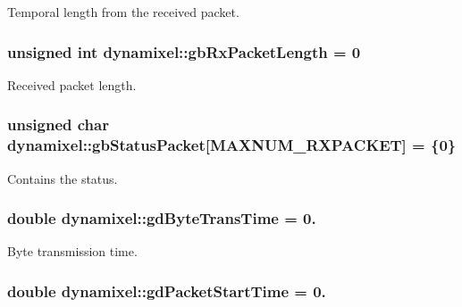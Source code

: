 Temporal length from the received packet. 

\hypertarget{classdynamixel_a333686e1b5903d16c41df8172b6bd5a8}{}
\subsubsection[{gb\+Rx\+Packet\+Length}]{\setlength{\rightskip}{0pt plus 5cm}unsigned int dynamixel\+::gb\+Rx\+Packet\+Length = 0\hspace{0.3cm}{\ttfamily [private]}}\label{classdynamixel_a333686e1b5903d16c41df8172b6bd5a8}


Received packet length. 

\hypertarget{classdynamixel_aa57c86d3bbbeaf5c9d4f6bd00376b04f}{}
\subsubsection[{gb\+Status\+Packet}]{\setlength{\rightskip}{0pt plus 5cm}unsigned char dynamixel\+::gb\+Status\+Packet\mbox{[}M\+A\+X\+N\+U\+M\+\_\+\+R\+X\+P\+A\+C\+K\+E\+T\mbox{]} = \{0\}\hspace{0.3cm}{\ttfamily [private]}}\label{classdynamixel_aa57c86d3bbbeaf5c9d4f6bd00376b04f}


Contains the status. 

\hypertarget{classdynamixel_a2173f25c6299da7ddb37ba3d2bf1f738}{}
\subsubsection[{gd\+Byte\+Trans\+Time}]{\setlength{\rightskip}{0pt plus 5cm}double dynamixel\+::gd\+Byte\+Trans\+Time = 0.\hspace{0.3cm}{\ttfamily [private]}}\label{classdynamixel_a2173f25c6299da7ddb37ba3d2bf1f738}


Byte transmission time. 

\hypertarget{classdynamixel_a6c6314fb7070e6fd361e57c5de17e0ec}{}
\subsubsection[{gd\+Packet\+Start\+Time}]{\setlength{\rightskip}{0pt plus 5cm}double dynamixel\+::gd\+Packet\+Start\+Time = 0.\hspace{0.3cm}{\ttfamily [private]}}\label{classdynamixel_a6c6314fb7070e6fd361e57c5de17e0ec}


